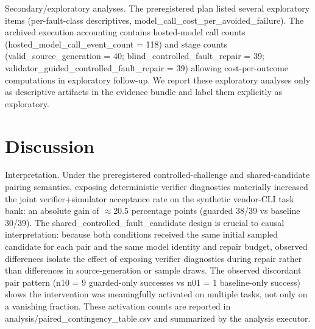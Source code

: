 \documentclass[conference]{IEEEtran}
\begin{document}
Secondary/exploratory analyses. The preregistered plan listed several exploratory items (per-fault-class descriptives, model\_call\_cost\_per\_avoided\_failure). The archived execution accounting contains hosted-model call counts (hosted\_model\_call\_event\_count = 118) and stage counts (valid\_source\_generation = 40; blind\_controlled\_fault\_repair = 39; validator\_guided\_controlled\_fault\_repair = 39) allowing cost-per-outcome computations in exploratory follow-up. We report these exploratory analyses only as descriptive artifacts in the evidence bundle and label them explicitly as exploratory.

\section{Discussion}
Interpretation. Under the preregistered controlled-challenge and shared-candidate pairing semantics, exposing deterministic verifier diagnostics materially increased the joint verifier+simulator acceptance rate on the synthetic vendor-CLI task bank: an absolute gain of \ensuremath{\approx}20.5 percentage points (guarded 38/39 vs baseline 30/39). The shared\_controlled\_fault\_candidate design is crucial to causal interpretation: because both conditions received the same initial sampled candidate for each pair and the same model identity and repair budget, observed differences isolate the effect of exposing verifier diagnostics during repair rather than differences in source-generation or sample draws. The observed discordant pair pattern (n10 = 9 guarded-only successes vs n01 = 1 baseline-only success) shows the intervention was meaningfully activated on multiple tasks, not only on a vanishing fraction. These activation counts are reported in analysis/paired\_contingency\_table.csv and summarized by the analysis executor.
\end{document}
